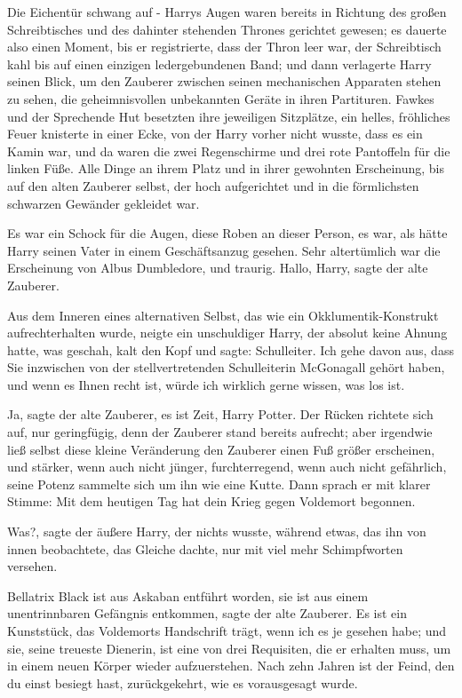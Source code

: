 Die Eichentür schwang auf - Harrys Augen waren bereits in Richtung des großen
Schreibtisches und des dahinter stehenden Thrones gerichtet gewesen; es dauerte
also einen Moment, bis er registrierte, dass der Thron leer war, der
Schreibtisch kahl bis auf einen einzigen ledergebundenen Band; und dann
verlagerte Harry seinen Blick, um den Zauberer zwischen seinen mechanischen
Apparaten stehen zu sehen, die geheimnisvollen unbekannten Geräte in ihren
Partituren. Fawkes und der Sprechende Hut besetzten ihre jeweiligen Sitzplätze,
ein helles, fröhliches Feuer knisterte in einer Ecke, von der Harry vorher nicht
wusste, dass es ein Kamin war, und da waren die zwei Regenschirme und drei rote
Pantoffeln für die linken Füße. Alle Dinge an ihrem Platz und in ihrer gewohnten
Erscheinung, bis auf den alten Zauberer selbst, der hoch aufgerichtet und in die
förmlichsten schwarzen Gewänder gekleidet war.

Es war ein Schock für die Augen, diese Roben an dieser Person, es war, als hätte
Harry seinen Vater in einem Geschäftsanzug gesehen. Sehr altertümlich war die
Erscheinung von Albus Dumbledore, und traurig. \glqq{}Hallo, Harry\grqq{}, sagte
der alte Zauberer.

Aus dem Inneren eines alternativen Selbst, das wie ein Okklumentik-Konstrukt
aufrechterhalten wurde, neigte ein unschuldiger Harry, der absolut keine Ahnung
hatte, was geschah, kalt den Kopf und sagte: \glqq{}Schulleiter. Ich gehe davon
aus, dass Sie inzwischen von der stellvertretenden Schulleiterin McGonagall
gehört haben, und wenn es Ihnen recht ist, würde ich wirklich gerne wissen, was
los ist.\grqq{}

\glqq{}Ja\grqq{}, sagte der alte Zauberer, \glqq{}es ist Zeit, Harry
Potter.\grqq{} Der Rücken richtete sich auf, nur geringfügig, denn der Zauberer
stand bereits aufrecht; aber irgendwie ließ selbst diese kleine Veränderung den
Zauberer einen Fuß größer erscheinen, und stärker, wenn auch nicht jünger,
furchterregend, wenn auch nicht gefährlich, seine Potenz sammelte sich um ihn
wie eine Kutte. Dann sprach er mit klarer Stimme: \glqq{}Mit dem heutigen Tag hat
dein Krieg gegen Voldemort begonnen.\grqq{}

\glqq{}Was?\grqq{}, sagte der äußere Harry, der nichts wusste, während etwas, das
ihn von innen beobachtete, das Gleiche dachte, nur mit viel mehr Schimpfworten
versehen.

\glqq{}Bellatrix Black ist aus Askaban entführt worden, sie ist aus einem
unentrinnbaren Gefängnis entkommen\grqq{}, sagte der alte Zauberer. \glqq{}Es ist
ein Kunststück, das Voldemorts Handschrift trägt, wenn ich es je gesehen habe;
und sie, seine treueste Dienerin, ist eine von drei Requisiten, die er erhalten
muss, um in einem neuen Körper wieder aufzuerstehen. Nach zehn Jahren ist der
Feind, den du einst besiegt hast, zurückgekehrt, wie es vorausgesagt
wurde.\grqq{}

